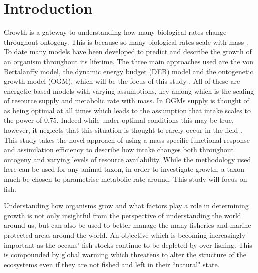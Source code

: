 \documentclass[a4paper, 11pt, hidelinks]{article} %
\begin{document}
	\tableofcontents
	\newpage

\section{Introduction}
	\linenumbers
	Growth is a gateway to understanding how many biological rates change throughout ontogeny.  This is because so many biological rates scale with mass \parencite{Kleiber1932}.  To date many models have been developed to predict and describe the growth of an organism throughout its lifetime.  The three main approaches used are the von Bertalanffy model, the dynamic energy budget (DEB) model and the ontogenetic growth model (OGM), which will be the focus of this study \parencite{Putter1918, vonBertalanffy1938, Kooijman1986, West2001}.  All of these are energetic based models with varying assumptions, key among which is the scaling of resource supply and metabolic rate with mass.   In OGMs supply is thought of as being optimal at all times which leads to the assumption that intake scales to the power of 0.75.  Indeed while under optimal conditions this may be true, however, it neglects that this situation is thought to rarely occur in the field \parencite{Pawar2012}.
	This study takes the novel approach of using a mass specific functional response and assimilation efficiency to describe how intake changes both throughout ontogeny and varying levels of resource availability. While the methodology used here can be used for any animal taxon, in order to investigate growth, a taxon much be chosen to parametrise metabolic rate around.  This study will focus on fish.
		
	Understanding how organisms grow and what factors play a role in determining growth is not only insightful from the perspective of understanding the world around us, but can also be used to better manage the many fisheries and marine protected areas around the world.  An objective which is becoming increasingly important as the oceans' fish stocks continue to be depleted by over fishing. 
	This is compounded by global warming which threatens to alter the structure of the ecosystems even if they are not fished and left in their ``natural" state. 
	
\end{document}
